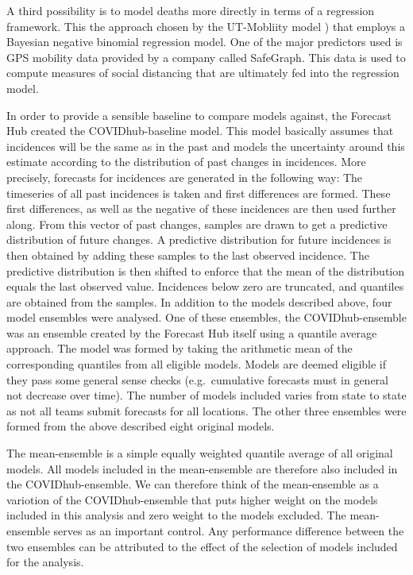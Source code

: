 \documentclass[
]{book}
\begin{document}
A third possibility is to model deaths more directly in terms of a regression framework. This the approach chosen by the UT-Mobliity model \citep{woodyProjectionsFirstwaveCOVID192020}) that employs a Bayesian negative binomial regression model. One of the major predictors used is GPS mobility data provided by a company called SafeGraph. This data is used to compute measures of social distancing that are ultimately fed into the regression model.

In order to provide a sensible baseline to compare models against, the Forecast Hub created the COVIDhub-baseline model. This model basically assumes that incidences will be the same as in the past and models the uncertainty around this estimate according to the distribution of past changes in incidences. More precisely, forecasts for incidences are generated in the following way: The timeseries of all past incidences is taken and first differences are formed. These first differences, as well as the negative of these incidences are then used further along. From this vector of past changes, samples are drawn to get a predictive distribution of future changes. A predictive distribution for future incidences is then obtained by adding these samples to the last observed incidence. The predictive distribution is then shifted to enforce that the mean of the distribution equals the last observed value. Incidences below zero are truncated, and quantiles are obtained from the samples.
In addition to the models described above, four model ensembles were analysed. One of these ensembles, the COVIDhub-ensemble was an ensemble created by the Forecast Hub itself using a quantile average approach. The model was formed by taking the arithmetic mean of the corresponding quantiles from all eligible models. Models are deemed eligible if they pass some general sense checks (e.g.~cumulative forecasts must in general not decrease over time). The number of models included varies from state to state as not all teams submit forecasts for all locations. The other three ensembles were formed from the above described eight original models.

The mean-ensemble is a simple equally weighted quantile average of all original models. All models included in the mean-ensemble are therefore also included in the COVIDhub-ensemble. We can therefore think of the mean-ensemble as a variotion of the COVIDhub-ensemble that puts higher weight on the models included in this analysis and zero weight to the models excluded. The mean-ensemble serves as an important control. Any performance difference between the two ensembles can be attributed to the effect of the selection of models included for the analysis.
\end{document}
